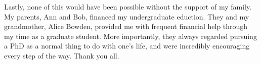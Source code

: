 Lastly, none of this would have been possible without the support of my family. My parents, Ann and Bob, financed my undergraduate eduction. They and my grandmother, Alice Bowden, provided me with frequent financial help through my time as a graduate student. More importantly, they always regarded pursuing a PhD as a normal thing to do with one's life, and were incredibly encouraging every step of the way. Thank you all.